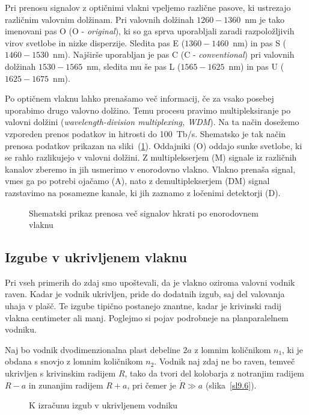 \begin{remark}
Pri prenosu signalov z optičnimi vlakni vpeljemo različne pasove, ki ustrezajo 
različnim valovnim dolžinam. Pri valovnih dolžinah $1260-1360$~nm je tako imenovani
pas O (O - {\it original}), ki so ga sprva uporabljali zaradi razpoložljivih virov svetlobe
in nizke disperzije. Sledita pas E ($1360-1460$~nm) in pas S ($1460-1530$~nm). 
Najširše uporabljan je pas C (C - {\it conventional}) pri valovnih dolžinah $1530-1565$~nm,
sledita mu še pas L ($1565-1625$~nm) in pas U ($1625-1675$~nm).

Po optičnem vlaknu lahko prenašamo več informacij, če za vsako posebej uporabimo
drugo valovno dolžino. Temu procesu pravimo multipleksiranje po valovni dolžini
({\it wavelength-division multiplexing, WDM}).
Na ta način dosežemo vzporeden prenos podatkov in hitrosti do 100~Tb/s.
Shematsko je tak način prenosa podatkov prikazan na sliki~(\ref{WDM}).
Oddajniki (O) oddajo sunke svetlobe, ki se rahlo razlikujejo v valovni dolžini. 
Z multiplekserjem (M) signale iz različnih kanalov zberemo in jih usmerimo v 
enorodovno vlakno. Vlakno prenaša signal, vmes ga po potrebi ojačamo (A), 
nato z demultiplekserjem (DM) signal razstavimo na posamezne kanale, ki jih 
zaznamo z ločenimi detektorji (D).
\begin{figure}[h]
\centering
\def\svgwidth{120truemm} 
 
\caption{Shematski prikaz prenosa več signalov hkrati po enorodovnem vlaknu}
\label{WDM}
\end{figure}
\end{remark}

\subsection*{Izgube v ukrivljenem vlaknu}
Pri vseh primerih do zdaj smo upoštevali, da je vlakno oziroma valovni 
vodnik raven. Kadar je vodnik ukrivljen, pride do dodatnih izgub, saj 
del valovanja uhaja v plašč. Te izgube tipično postanejo znantne, 
kadar je krivinski radij vlakna centimeter ali manj. Poglejmo si pojav podrobneje na
planparalelnem vodniku.

Naj bo vodnik dvodimenzionalna plast debeline $2a$ z lomnim količnikom
$n_{1}$, ki je obdana s snovjo z lomnim količnikom $n_{2}$. Vodnik naj
zdaj ne bo raven, temveč ukrivljen s krivinskim radijem $R$, tako da tvori 
del kolobarja z notranjim radijem $R-a$ in zunanjim radijem $R+a$, pri 
čemer je $\dot{R}\gg a$ (slika~\ref{sl9.6}). 
\begin{figure}[h]
\centering
\def\svgwidth{60truemm} 
% 
\caption{K izračunu izgub v ukrivljenem vodniku}
\label{fig:bend}
\end{figure}

